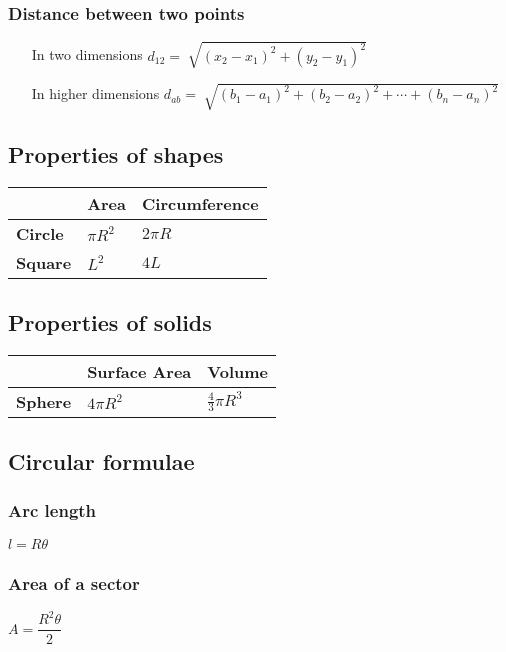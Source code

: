 \subsubsection{Distance between two points}
\begin{itemize}
\item[In two dimensions]
\itemt \( d_{12} = \sqrt[]{(x_2-x_1)^2 + (y_2-y_1)^2} \)
\item[In higher dimensions]
\itemt \( d_{ab} = \sqrt[]{(b_1-a_1)^2 + (b_2-a_2)^2 + \cdots + (b_n - a_n)^2} \)
\end{itemize}
            


\def\arraystretch{1.5}

		\subsection{Properties of shapes}
\begin{tabular}{|l|l|l|}
\hline
				& \textbf{Area} 		& \textbf{Circumference}
\\ \hline 
\textbf{Circle}	& \( \pi R^2 \)			& \( 2 \pi R \)
\\ \hline
\textbf{Square} & \( L^2	\)			& \( 4L \)
\\ \hline
\end{tabular}

		\subsection{Properties of solids}
\begin{tabular}{|l|l|l|}
\hline
				& \textbf{Surface Area} & \textbf{Volume}
\\ \hline 
\textbf{Sphere}	& \( 4\pi R^2 \)		& \( \frac{4}{3} \pi R^3 \)
\\ \hline
\end{tabular}

		\subsection{Circular formulae}

\subsubsection{Arc length}
\begin{itemize}
\itemt \( l = R\theta \)
\end{itemize}

\subsubsection{Area of a sector}
\begin{itemize}
\itemt \( A = \dfrac{R^2\theta}{2} \)
\end{itemize}

